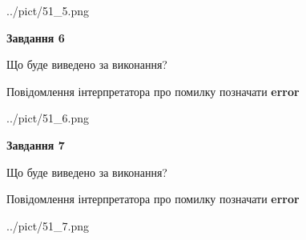 \documentclass[10pt, ukrainian]{article}
\begin{document}
{\begin {large}
\begin{center}
	{../pict/51_5.png}
\end{center}
\newpage

{\begin {center}\textbf{Завдання 6}\end {center}}\par
Що буде виведено за виконання? \par
Повідомлення інтерпретатора про помилку позначати \textbf{error}

\begin{center}
	{../pict/51_6.png}
\end{center}
\newpage

{\begin {center}\textbf{Завдання 7}\end {center}}\par
Що буде виведено за виконання? \par
Повідомлення інтерпретатора про помилку позначати \textbf{error}

\begin{center}
	{../pict/51_7.png}
\end{center}
\newpage

\end {large}}
\end{document}
